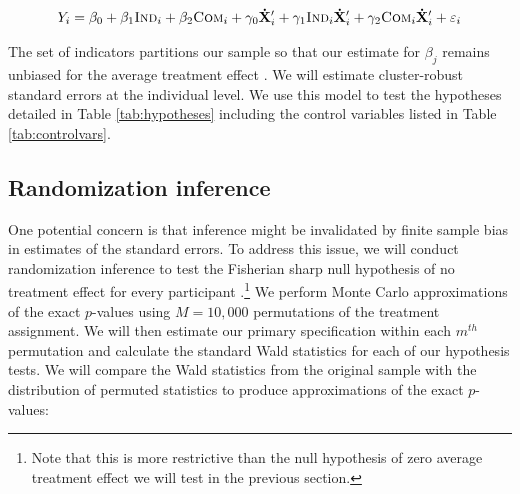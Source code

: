 \documentclass[11pt, a4paper]{article}\usepackage[]{graphicx}\usepackage[]{color}
\begin{document}
        \begin{equation} \label{eq:controls}
            Y_{i} = \beta_{0} + \beta_{1}\text{\textsc{Ind}}_{i} + \beta_{2}\text{\textsc{Com}}_{i} + \gamma_{0} \mathbf{\dot X}'_i + \gamma_{1}\text{\textsc{Ind}}_{i} \mathbf{\dot X}'_i + \gamma_{2}\text{\textsc{Com}}_{i} \mathbf{\dot X}'_i + \varepsilon_{i}
        \end{equation}

        The set of indicators partitions our sample so that our estimate for $\beta_j$ remains unbiased for the average treatment effect \parencite{lin_agnostic_2013}. We will estimate cluster-robust standard errors at the individual level. We use this model to test the hypotheses detailed in Table \ref{tab:hypotheses} including the control variables listed in Table \ref{tab:controlvars}.

        \begin{table}[h]
        \centering
        \caption{Control variables for covariate adjustment}
        \label{tab:controlvars}
        \end{table}

    \subsection{Randomization inference} %

        One potential concern is that inference might be invalidated by finite sample bias in estimates of the standard errors. To address this issue, we will conduct randomization inference to test the Fisherian sharp null hypothesis of no treatment effect for every participant \parencite{fisher_design_1935}.\footnote{Note that this is more restrictive than the null hypothesis of zero average treatment effect we will test in the previous section.} We perform Monte Carlo approximations of the exact $p$-values using $M=10,000$ permutations of the treatment assignment. We will then estimate our primary specification within each $m^{th}$ permutation and calculate the standard Wald statistics for each of our hypothesis tests. We will compare the Wald statistics from the original sample with the distribution of permuted statistics to produce approximations of the exact $p$-values:
\end{document}
